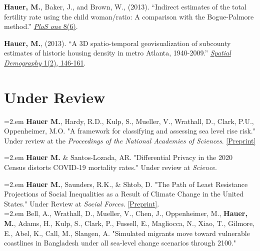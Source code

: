 \begin{etaremune}
\item \textbf{Hauer, M.}, Baker, J., and Brown, W., (2013). ``Indirect estimates of the total fertility rate using the child                        woman/ratio: A comparison with the Bogue-Palmore method.'' \href{http://journals.plos.org/plosone/article?id=10.1371/journal.pone.0067226}{\textit{PloS one} 8(6)}.\\

\item \textbf{Hauer, M.}, (2013). ``A 3D spatio-temporal geovisualization of subcounty estimates of historic housing density in metro Atlanta, 1940-2009.'' \href{http://link.springer.com/article/10.1007/BF03354895}{\textit{Spatial Demography} 1(2), 146-161}.\\

 \end{etaremune}


\section{Under Review}

\hangindent=2.em \textbf{Hauer M.}, Hardy, R.D., Kulp, S., Mueller, V., Wrathall, D., Clark, P.U., Oppenheimer, M.O. "A framework for classifying and assessing sea level rise risk." Under review at the \textit{Proceedings of the National Academies of Sciences}. \href{https://osf.io/preprints/socarxiv/tf6rj/}{[Preprint]}

\hangindent=2.em \textbf{Hauer M.} \& Santos-Lozada, AR. "Differential Privacy in the 2020 Census distorts COVID-19 mortality rates." Under review at \textit{Science}.

 \hangindent=2.em \textbf{Hauer M.}, Saunders, R.K., \& Shtob, D. "The Path of Least Resistance Projections of Social Inequalities as a Result of Climate Change in the United States." Under Review at \textit{Social Forces}. \href{https://osf.io/preprints/socarxiv/7jtrn/}{[Preprint]}. \\

 \hangindent=2.em Bell, A., Wrathall, D., Mueller, V., Chen, J., Oppenheimer, M., \textbf{Hauer, M.}, Adams, H., Kulp, S., Clark, P., Fussell, E., Magliocca, N., Xiao, T., Gilmore, E., Abel, K., Call, M., Slangen, A. "Simulated migrants move toward vulnerable coastlines in Bangladesh under all sea-level change scenarios through 2100."

